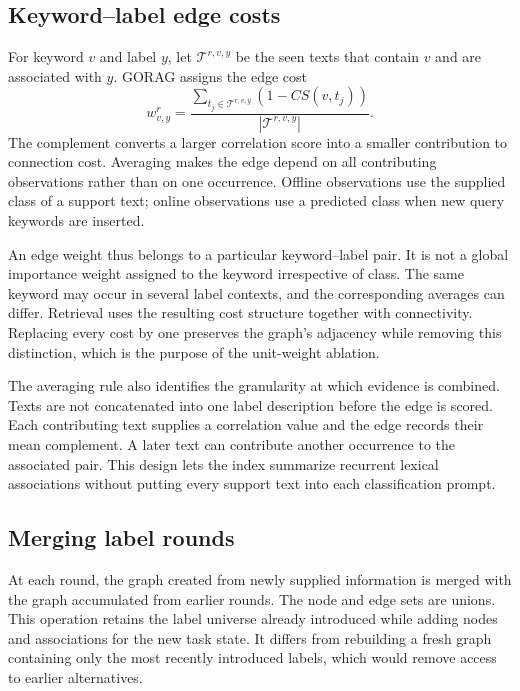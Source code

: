 \subsection{Keyword--label edge costs}
\label{sec:gorag:weights}

For keyword $v$ and label $y$, let $\mathcal{T}^{r,v,y}$ be the seen texts that contain $v$ and are associated with $y$. GORAG assigns the edge cost
\begin{equation}
w_{v,y}^r=\frac{\sum_{t_j\in\mathcal{T}^{r,v,y}}(1-CS(v,t_j))}{|\mathcal{T}^{r,v,y}|}.
\label{eq:gorag:weights}
\end{equation}
The complement converts a larger correlation score into a smaller contribution to connection cost. Averaging makes the edge depend on all contributing observations rather than on one occurrence. Offline observations use the supplied class of a support text; online observations use a predicted class when new query keywords are inserted.

An edge weight thus belongs to a particular keyword--label pair. It is not a global importance weight assigned to the keyword irrespective of class. The same keyword may occur in several label contexts, and the corresponding averages can differ. Retrieval uses the resulting cost structure together with connectivity. Replacing every cost by one preserves the graph's adjacency while removing this distinction, which is the purpose of the unit-weight ablation.

The averaging rule also identifies the granularity at which evidence is combined. Texts are not concatenated into one label description before the edge is scored. Each contributing text supplies a correlation value and the edge records their mean complement. A later text can contribute another occurrence to the associated pair. This design lets the index summarize recurrent lexical associations without putting every support text into each classification prompt.

\subsection{Merging label rounds}
\label{sec:gorag:merge}

At each round, the graph created from newly supplied information is merged with the graph accumulated from earlier rounds. The node and edge sets are unions. This operation retains the label universe already introduced while adding nodes and associations for the new task state. It differs from rebuilding a fresh graph containing only the most recently introduced labels, which would remove access to earlier alternatives.

